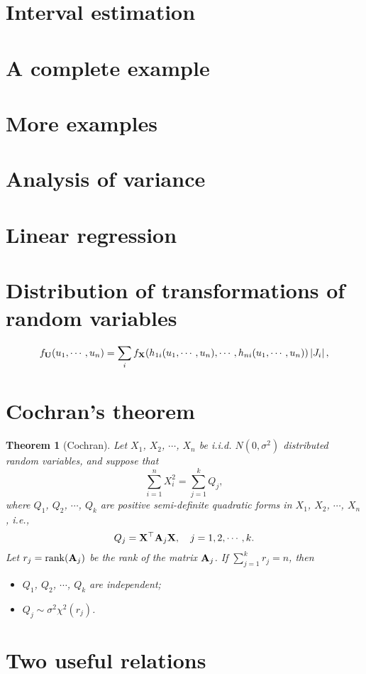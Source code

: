 \documentclass[12pt]{article}
\newtheorem{theorem}{Theorem}[section]
\theoremstyle{definition}
\begin{document}
\section{Interval estimation}

\section{A complete example}

\section{More examples}

\section{Analysis of variance}

\section{Linear regression}

\appendix

  \section{Distribution of transformations of random variables}
  \label{tf}

    \begin{equation}
      f_{{\bf U}}(u_1,\cdots,u_n)=\sum_{i}f_{{\bf X}}
                 (h_{1i}(u_1,\cdots,u_n),\cdots,h_{ni}(u_1,\cdots,u_n))\left|J_i\right|,
    \end{equation}

  \section{Cochran's theorem}

    \begin{theorem}[Cochran]
      Let $X_1$, $X_2$, $\cdots$, $X_n$ be i.i.d. $N(0,\sigma^2)$ distributed random
      variables, and suppose that
      \[\sum_{i=1}^n X_i^2 = \sum_{j=1}^k Q_j, \]
      where $Q_1$, $Q_2$, $\cdots$, $Q_k$ are positive semi-definite quadratic forms in
      $X_1$, $X_2$, $\cdots$, $X_n$, {\it i.e.},
      \[ Q_j = {\bf X}^{\top}{\bf A}_j{\bf X},\quad j=1,2,\cdots,k. \]
      Let $r_j={\rm rank}({\bf A}_j)$ be the rank of the matrix ${\bf A}_j$. If $\sum_{j=1}^kr_j=n$,
      then
      \begin{itemize}
        \item $Q_1$, $Q_2$, $\cdots$, $Q_k$ are independent;
        \item $Q_j \sim \sigma^2\chi^2(r_j)$.
      \end{itemize}
    \end{theorem}

  \section{Two useful relations}

\begin{thebibliography}{99}
\end{thebibliography}
\end{document}
